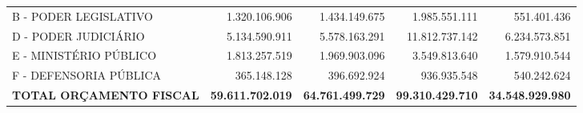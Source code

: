 \documentclass{article}
\begin{document}
\begin{longtable}[c]{m{5cm}|m{3cm}|m{3cm}|m{3cm}|m{3cm}}
\multicolumn{1}{L{5cm}|}{ B - PODER LEGISLATIVO } & \multicolumn{1}{r|}{ 1.320.106.906 } & \multicolumn{1}{r|}{ 1.434.149.675 } & \multicolumn{1}{r|}{ 1.985.551.111 } & \multicolumn{1}{r}{ 551.401.436 } \\
\multicolumn{1}{L{5cm}|}{ D - PODER JUDICIÁRIO } & \multicolumn{1}{r|}{ 5.134.590.911 } & \multicolumn{1}{r|}{ 5.578.163.291 } & \multicolumn{1}{r|}{ 11.812.737.142 } & \multicolumn{1}{r}{ 6.234.573.851 } \\
\multicolumn{1}{L{5cm}|}{ E - MINISTÉRIO PÚBLICO } & \multicolumn{1}{r|}{ 1.813.257.519 } & \multicolumn{1}{r|}{ 1.969.903.096 } & \multicolumn{1}{r|}{ 3.549.813.640 } & \multicolumn{1}{r}{ 1.579.910.544 } \\
\multicolumn{1}{L{5cm}|}{ F - DEFENSORIA PÚBLICA } & \multicolumn{1}{r|}{ 365.148.128 } & \multicolumn{1}{r|}{ 396.692.924 } & \multicolumn{1}{r|}{ 936.935.548 } & \multicolumn{1}{r}{ 540.242.624 } \\
\hline \hline 
\multicolumn{1}{L{5cm}|}{ \textbf{TOTAL ORÇAMENTO FISCAL }} & \multicolumn{1}{r|}{ \textbf{ 59.611.702.019 }} & \multicolumn{1}{r|}{ \textbf{ 64.761.499.729 }} & \multicolumn{1}{r|}{ \textbf{ 99.310.429.710 }} & \multicolumn{1}{r}{ \textbf{ 34.548.929.980 }} \\\end{longtable}\raggedright\fontsize{9pt}{10pt}\selectfont {FONTE: Armazém SIAFI.} \\\vskip 0.2cm\fontsize{9pt}{10pt}\selectfont {ELABORAÇÃO: DCAF/SCPPO/SEPLAG}\\\vskip 0.2cm\fontsize{9pt}{10pt}\selectfont {Nota: Na elaboração deste relatório foram consideradas as estimativas de inflação previstas no Boletim Focus de 21/09/18, com projeção de IPCA de 4,28\% para 2018 e 4,18\% para 2019.}\\
\end{document}

